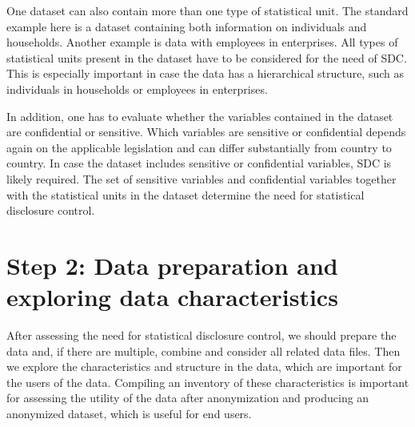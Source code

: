 \documentclass[letterpaper,10pt,english]{sphinxmanual}
\begin{document}
One dataset can also contain more than one type of statistical unit. The
standard example here is a dataset containing both information on
individuals and households. Another example is data with employees in
enterprises. All types of statistical units present in the dataset have
to be considered for the need of SDC. This is especially important in
case the data has a hierarchical structure, such as individuals in
households or employees in enterprises.

In addition, one has to evaluate whether the variables contained in the
dataset are confidential or sensitive. Which variables are sensitive or
confidential depends again on the applicable legislation and can differ
substantially from country to country. In case the dataset includes
sensitive or confidential variables, SDC is likely required. The set of
sensitive variables and confidential variables together with the
statistical units in the dataset determine the need for statistical
disclosure control.


\section{Step 2: Data preparation and exploring data characteristics}
\label{\detokenize{process:step-2-data-preparation-and-exploring-data-characteristics}}
After assessing the need for statistical disclosure control, we should
prepare the data and, if there are multiple, combine and consider all
related data files. Then we explore the characteristics and structure in
the data, which are important for the users of the data. Compiling an
inventory of these characteristics is important for assessing the
utility of the data after anonymization and producing an anonymized
dataset, which is useful for end users.
\end{document}
